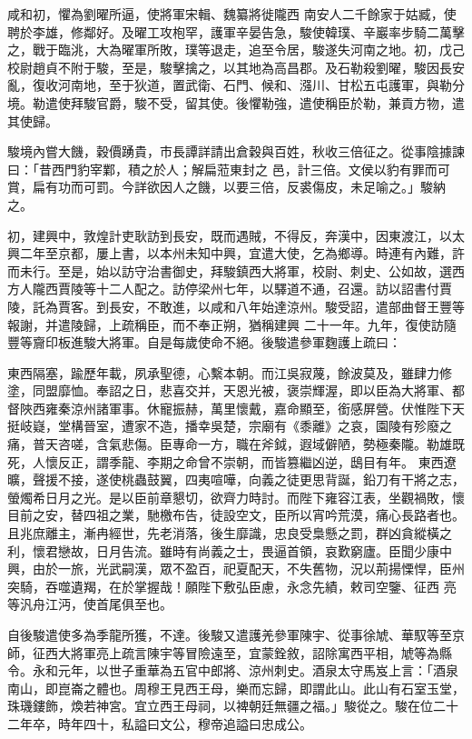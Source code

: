 \begin{pinyinscope}
 咸和初，懼為劉曜所逼，使將軍宋輯、魏纂將徙隴西
 南安人二千餘家于姑臧，使聘於李雄，修鄰好。及曜工攻枹罕，護軍辛晏告急，駿使韓璞、辛巖率步騎二萬擊之，戰于臨洮，大為曜軍所敗，璞等退走，追至令居，駿遂失河南之地。初，戊己校尉趙貞不附于駿，至是，駿擊擒之，以其地為高昌郡。及石勒殺劉曜，駿因長安亂，復收河南地，至于狄道，置武衛、石門、候和、漒川、甘松五屯護軍，與勒分境。勒遣使拜駿官爵，駿不受，留其使。後懼勒強，遣使稱臣於勒，兼貢方物，遣其使歸。



 駿境內嘗大饑，穀價踴貴，市長譚詳請出倉穀與百姓，秋收三倍征之。從事陰據諫曰：「昔西門豹宰鄴，積之於人；解扁蒞東封之
 邑，計三倍。文侯以豹有罪而可賞，扁有功而可罰。今詳欲因人之饑，以要三倍，反裘傷皮，未足喻之。」駿納之。



 初，建興中，敦煌計吏耿訪到長安，既而遇賊，不得反，奔漢中，因東渡江，以太興二年至京都，屢上書，以本州未知中興，宜遣大使，乞為鄉導。時連有內難，許而未行。至是，始以訪守治書御史，拜駿鎮西大將軍，校尉、刺史、公如故，選西方人隴西賈陵等十二人配之。訪停梁州七年，以驛道不通，召還。訪以詔書付賈陵，託為賈客。到長安，不敢進，以咸和八年始達涼州。駿受詔，遣部曲督王豐等報謝，并遣陵歸，上疏稱臣，而不奉正朔，猶稱建興
 二十一年。九年，復使訪隨豐等齎印板進駿大將軍。自是每歲使命不絕。後駿遣參軍麴護上疏曰：



 東西隔塞，踰歷年載，夙承聖德，心繫本朝。而江吳寂蔑，餘波莫及，雖肆力修塗，同盟靡恤。奉詔之日，悲喜交并，天恩光被，褒崇輝渥，即以臣為大將軍、都督陜西雍秦涼州諸軍事。休寵振赫，萬里懷戴，嘉命顯至，銜感屏營。伏惟陛下天挺岐嶷，堂構晉室，遭家不造，播幸吳楚，宗廟有《黍離》之哀，園陵有殄廢之痛，普天咨嗟，含氣悲傷。臣專命一方，職在斧鉞，遐域僻陋，勢極秦隴。勒雄既死，人懷反正，謂季龍、李期之命曾不崇朝，而皆篡繼凶逆，鴟目有年。
 東西遼曠，聲援不接，遂使桃蟲鼓翼，四夷喧嘩，向義之徒更思背誕，鉛刀有干將之志，螢燭希日月之光。是以臣前章懇切，欲齊力時討。而陛下雍容江表，坐觀禍敗，懷目前之安，替四祖之業，馳檄布告，徒設空文，臣所以宵吟荒漠，痛心長路者也。且兆庶離主，漸冉經世，先老消落，後生靡識，忠良受梟懸之罰，群凶貪縱橫之利，懷君戀故，日月告流。雖時有尚義之士，畏逼首領，哀歎窮廬。臣聞少康中興，由於一旅，光武嗣漢，眾不盈百，祀夏配天，不失舊物，況以荊揚慄悍，臣州突騎，吞噬遺羯，在於掌握哉！願陛下敷弘臣慮，永念先績，敕司空鑒、征西
 亮等汎舟江沔，使首尾俱至也。



 自後駿遣使多為季龍所獲，不達。後駿又遣護羌參軍陳宇、從事徐虓、華馭等至京師，征西大將軍亮上疏言陳宇等冒險遠至，宜蒙銓敘，詔除寓西平相，虓等為縣令。永和元年，以世子重華為五官中郎將、涼州刺史。酒泉太守馬岌上言：「酒泉南山，即崑崙之體也。周穆王見西王母，樂而忘歸，即謂此山。此山有石室玉堂，珠璣鏤飾，煥若神宮。宜立西王母祠，以裨朝廷無疆之福。」駿從之。駿在位二十二年卒，時年四十，私謚曰文公，穆帝追謚曰忠成公。




\end{pinyinscope}
